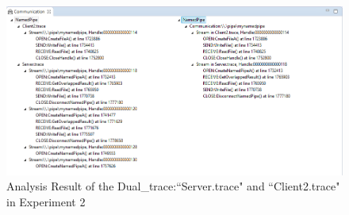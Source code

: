 \begin{figure}[H]
\centerline{\includegraphics[scale=0.55]{Figures/result22}}
 \caption{Analysis Result of the Dual\_trace:``Server.trace" and ``Client2.trace" in Experiment 2}
\label{result22}
\end{figure}







   




